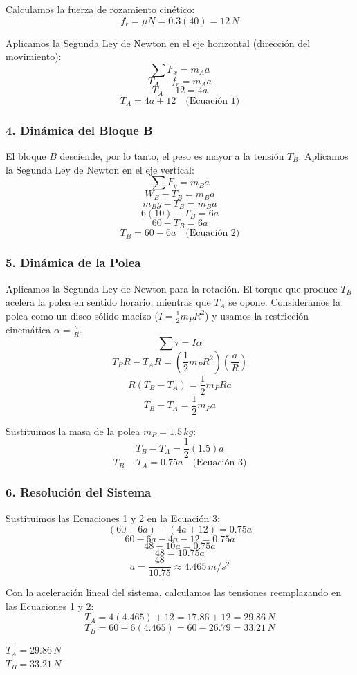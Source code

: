 \documentclass[12pt, a4paper]{article}
\begin{document}
Calculamos la fuerza de rozamiento cinético:
$$f_r = \mu N = 0.3(40) = 12 \, \si{N}$$

Aplicamos la Segunda Ley de Newton en el eje horizontal (dirección del movimiento):
$$\sum F_x = m_A a$$
$$T_A - f_r = m_A a$$
$$T_A - 12 = 4a$$
$$T_A = 4a + 12 \quad \text{(Ecuación 1)}$$

\subsubsection*{4. Dinámica del Bloque B}
El bloque $B$ desciende, por lo tanto, el peso es mayor a la tensión $T_B$. Aplicamos la Segunda Ley de Newton en el eje vertical:
$$\sum F_y = m_B a$$
$$W_B - T_B = m_B a$$
$$m_B g - T_B = m_B a$$
$$6(10) - T_B = 6a$$
$$60 - T_B = 6a$$
$$T_B = 60 - 6a \quad \text{(Ecuación 2)}$$

\subsubsection*{5. Dinámica de la Polea}
Aplicamos la Segunda Ley de Newton para la rotación. El torque que produce $T_B$ acelera la polea en sentido horario, mientras que $T_A$ se opone. Consideramos la polea como un disco sólido macizo ($I = \frac{1}{2} m_P R^2$) y usamos la restricción cinemática $\alpha = \frac{a}{R}$.
$$\sum \tau = I \alpha$$
$$T_B R - T_A R = \left( \frac{1}{2} m_P R^2 \right) \left( \frac{a}{R} \right)$$
$$R (T_B - T_A) = \frac{1}{2} m_P R a$$
$$T_B - T_A = \frac{1}{2} m_P a$$

Sustituimos la masa de la polea $m_P = 1.5 \, \si{kg}$:
$$T_B - T_A = \frac{1}{2}(1.5)a$$
$$T_B - T_A = 0.75a \quad \text{(Ecuación 3)}$$

\subsubsection*{6. Resolución del Sistema}
Sustituimos las Ecuaciones 1 y 2 en la Ecuación 3:
$$(60 - 6a) - (4a + 12) = 0.75a$$
$$60 - 6a - 4a - 12 = 0.75a$$
$$48 - 10a = 0.75a$$
$$48 = 10.75a$$
$$a = \frac{48}{10.75} \approx 4.465 \, \si{m/s^2}$$

Con la aceleración lineal del sistema, calculamos las tensiones reemplazando en las Ecuaciones 1 y 2:
$$T_A = 4(4.465) + 12 = 17.86 + 12 = 29.86 \, \si{N}$$
$$T_B = 60 - 6(4.465) = 60 - 26.79 = 33.21 \, \si{N}$$

\begin{tcolorbox}[colback=green!5!white, colframe=green!50!black, title=Respuesta Final]
\centering
$T_A = 29.86 \, \si{N}$ \\
$T_B = 33.21 \, \si{N}$
\end{tcolorbox}
\end{document}
